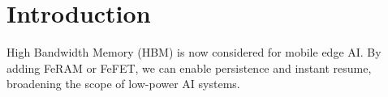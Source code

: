 
\section{Introduction}
High Bandwidth Memory (HBM) is now considered for mobile edge AI. By adding FeRAM or FeFET,
we can enable persistence and instant resume, broadening the scope of low-power AI systems.
